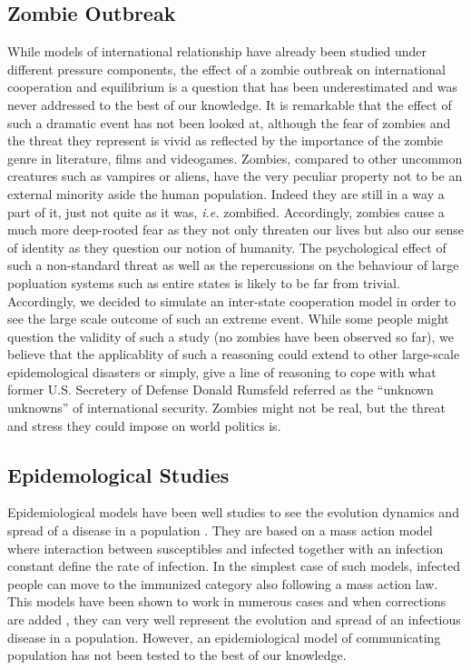 \documentclass[11pt]{article} %
\begin{document}
\subsection{Zombie Outbreak}\indent

While models of international relationship have already been studied under different pressure components, the effect of a zombie outbreak on international cooperation and equilibrium is a question that has been underestimated and was never addressed to the best of our knowledge. It is remarkable that the effect of such a dramatic event has not been looked at, although the fear of zombies and the threat they represent is vivid as reflected by the importance of the zombie genre in literature, films and videogames. \textcolor[rgb]{1,0,0}{Zombies, compared to other uncommon creatures such as vampires or aliens, have the very peculiar property not to be an external minority aside the human population. Indeed they are still  in a way a part of it, just not quite as it was, \textit{i.e.} zombified.} Accordingly, zombies cause a much more deep-rooted fear as they not only threaten our lives but also our sense of identity as they question our notion of humanity. The psychological effect of such a non-standard threat as well as the repercussions on the behaviour of large popluation systems such as entire states is likely to be far from trivial. Accordingly, we decided to simulate an inter-state cooperation model in order to see the large scale outcome of such an extreme event. While some people might question the validity of such a study (no zombies have been observed so far), we believe that the applicablity of such a reasoning could extend to other large-scale epidemological disasters or simply, give a line of reasoning to cope with what former U.S. Secretery of Defense Donald Rumsfeld referred as the ``unknown unknowns'' of international security. Zombies might not be real, but the threat and stress they could impose on world politics is.

\subsection{Epidemological Studies}\indent

Epidemiological models have been well studies to see the evolution dynamics and spread of a disease in a population \cite{brauer2008compartmental}. They are based on a mass action model where interaction between susceptibles and infected together with an infection constant define the rate of infection. In the simplest case of such models, infected people can move to the immunized category also following a mass action law. This models have been shown to work in numerous cases and  when corrections are added \cite{m1925applications, stone2007seasonal}, they can very well represent the evolution and spread of an infectious disease in a population. However, an epidemiological model of communicating population has not been tested to the best of our knowledge.
\end{document}
